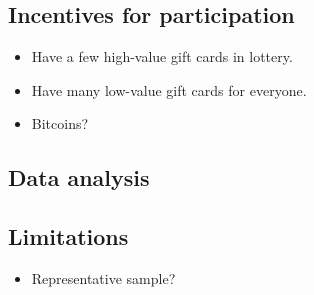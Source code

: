 \subsection{Incentives for participation}
\begin{itemize}
    \item Have a few high-value gift cards in lottery.
    \item Have many low-value gift cards for everyone.
    \item Bitcoins?
\end{itemize}

\subsection{Data analysis}

\subsection{Limitations}
\begin{itemize}
    \item Representative sample?
\end{itemize}
